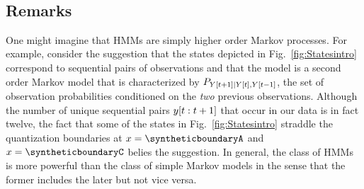 \begin{table}[htb]
  \caption[Words most frequently associated with each state.]%
  {Words most frequently associated with each state.  While we have no
    interpretation for some of the states, the following
    interpretations of other states are plausible.}
  \begin{center}{\plotsize%
      \\[2.0ex]
      
    }\end{center}
  \label{tab:POS}
\end{table}

\subsection{Remarks}
\label{sec:DHMMRemarks}

One might imagine that HMMs are simply higher order Markov processes.
For example, consider the suggestion that the states depicted in
Fig.~\ref{fig:Statesintro} correspond to sequential pairs of
observations and that the model is a second order Markov model that is
characterized by $P_{{Y}{[t+1]}\mid {Y}{[t]},{Y}{[t-1]}}$, the set of
observation probabilities conditioned on the \emph{two} previous
observations.  Although the number of unique sequential pairs
$y[t:t+1]$ that occur in our data is in fact twelve, the fact
that some of the states in Fig.~\ref{fig:Statesintro} straddle the
quantization boundaries at $x = \syntheticboundaryA$ and
$x=\syntheticboundaryC$ belies the suggestion.  In general, the class
of HMMs is more powerful than the class of simple Markov models in the
sense that the former includes the later but not vice versa.

